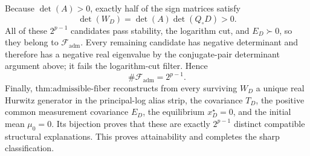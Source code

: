 Because \(\det(A)>0\), exactly half of the sign matrices satisfy
\[
 \det(W_D)=\det(A)\det(Q_\circ D)>0.
\]
All of these \(2^{p-1}\) candidates pass stability, the logarithm cut, and \(E_D\succ0\), so they belong to \(\mathcal F_{\mathrm{adm}}\).  Every remaining candidate has negative determinant and therefore has a negative real eigenvalue by the conjugate-pair determinant argument above; it fails the logarithm-cut filter.  Hence
\[
 \#\mathcal F_{\mathrm{adm}}=2^{p-1}.
\]
Finally, \(\text{thm:admissible-fiber}\) reconstructs from every surviving \(W_D\) a unique real Hurwitz generator in the principal-log alias strip, the covariance \(T_D\), the positive common measurement covariance \(E_D\), the equilibrium \(x_D^\star=0\), and the initial mean \(\mu_0=0\).  Its bijection proves that these are exactly \(2^{p-1}\) distinct compatible structural explanations.  This proves attainability and completes the sharp classification.
